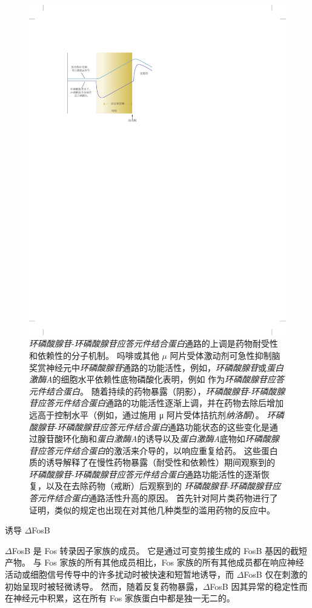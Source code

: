 \begin{figure}[htbp]
	\centering
	\includegraphics[width=0.55\linewidth]{chap43/fig_43_5}
	\caption{\textit{环磷酸腺苷}-\textit{环磷酸腺苷应答元件结合蛋白}通路的上调是药物耐受性和依赖性的分子机制。
		吗啡或其他 $\mu$ 阿片受体激动剂可急性抑制脑奖赏神经元中\textit{环磷酸腺苷}通路的功能活性，例如，\textit{环磷酸腺苷}或\textit{蛋白激酶A}的细胞水平依赖性底物磷酸化表明，例如 作为\textit{环磷酸腺苷应答元件结合蛋白}。
		随着持续的药物暴露（阴影），\textit{环磷酸腺苷}-\textit{环磷酸腺苷应答元件结合蛋白}通路的功能活性逐渐上调，并在药物去除后增加远高于控制水平（例如，通过施用 μ 阿片受体拮抗剂\textit{纳洛酮}）。 \textit{环磷酸腺苷}-\textit{环磷酸腺苷应答元件结合蛋白}通路功能状态的这些变化是通过腺苷酸环化酶和\textit{蛋白激酶A}的诱导以及\textit{蛋白激酶A}底物如\textit{环磷酸腺苷应答元件结合蛋白}的激活来介导的，以响应重复给药。
		这些蛋白质的诱导解释了在慢性药物暴露（耐受性和依赖性）期间观察到的 \textit{环磷酸腺苷}-\textit{环磷酸腺苷应答元件结合蛋白}通路功能活性的逐渐恢复，以及在去除药物（戒断）后观察到的 \textit{环磷酸腺苷}-\textit{环磷酸腺苷应答元件结合蛋白}通路活性升高的原因。
		首先针对阿片类药物进行了证明，类似的规定也出现在对其他几种类型的滥用药物的反应中\cite{trimble2002molecular}。}
	\label{fig:43_5}
\end{figure}


诱导 $\Delta$FosB

$\Delta$FosB 是 Fos 转录因子家族的成员。
它是通过可变剪接生成的 FosB 基因的截短产物。
与 Fos 家族的所有其他成员相比，Fos 家族的所有其他成员都在响应神经活动或细胞信号传导中的许多扰动时被快速和短暂地诱导，而 $\Delta$FosB 仅在刺激的初始呈现时被轻微诱导。
然而，随着反复药物暴露，$\Delta$FosB 因其异常的稳定性而在神经元中积累，这在所有 Fos 家族蛋白中都是独一无二的。


